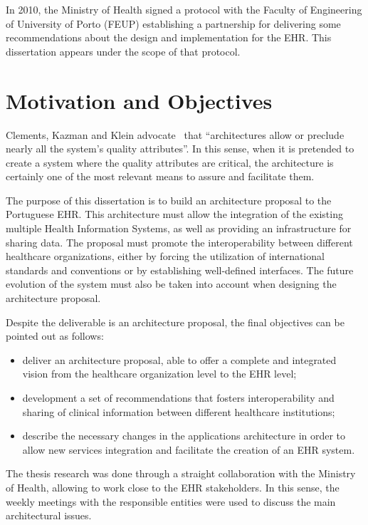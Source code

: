 In 2010, the Ministry of Health signed a protocol with the Faculty of Engineering of University of Porto (FEUP) establishing a partnership for delivering some recommendations about the design and implementation for the EHR. This dissertation appears under the scope of that protocol.

\section{Motivation and Objectives} \label{sec:goals}

Clements, Kazman and Klein advocate~\citep{Clements2001} that ``architectures allow or preclude nearly all the system's quality attributes''. In this sense, when it is pretended to create a system where the quality attributes are critical, the architecture is certainly one of the most relevant means to assure and facilitate them.

The purpose of this dissertation is to build an architecture proposal to the Portuguese EHR. This architecture must allow the integration of the existing multiple Health Information Systems, as well as providing an infrastructure for sharing data. The proposal must promote the interoperability between different healthcare organizations, either by forcing the utilization of international standards and conventions or by establishing well-defined interfaces. The future evolution of the system must also be taken into account when designing the architecture proposal.

Despite the deliverable is an architecture proposal, the final objectives can be pointed out as follows:
\begin{itemize}
\item deliver an architecture proposal, able to offer a complete and integrated vision from the healthcare organization level to the EHR level;
\item development a set of recommendations that fosters interoperability and sharing of clinical information between different healthcare institutions;
\item describe the necessary changes in the applications architecture in order to allow new services integration and facilitate the creation of an EHR system.
\end{itemize}

The thesis research was done through a straight collaboration with the Ministry of Health, allowing to work close to the EHR stakeholders. In this sense, the weekly meetings with the responsible entities were used to discuss the main architectural issues.


